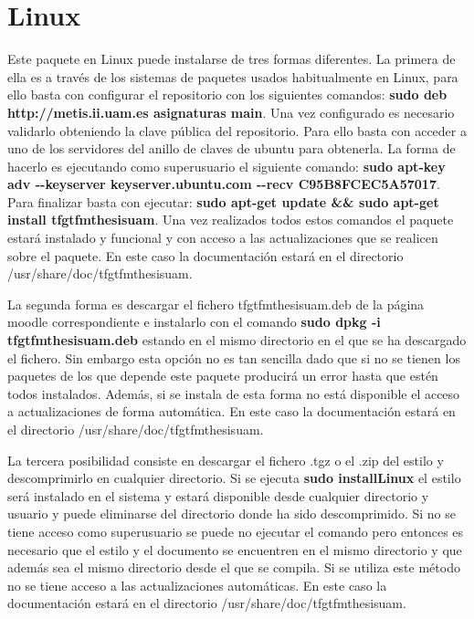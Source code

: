 \section{Linux}

Este paquete en Linux puede instalarse de tres formas diferentes. La primera de ella es a través de los sistemas de paquetes usados habitualmente en Linux,
para ello basta con configurar el repositorio con los siguientes comandos: \textbf{sudo deb http://metis.ii.uam.es asignaturas main}.
Una vez configurado es necesario validarlo obteniendo la clave pública del repositorio. Para ello basta con acceder a uno de los servidores del anillo de claves de ubuntu para obtenerla. La forma de hacerlo es ejecutando como superusuario el siguiente comando: \textbf{sudo apt-key adv -{-}keyserver keyserver.ubuntu.com -{-}recv C95B8FCEC5A57017}. Para finalizar basta con ejecutar: \textbf{sudo apt-get update \&\& sudo apt-get install tfgtfmthesisuam}. Una vez realizados todos estos comandos el paquete estará instalado y funcional y con acceso a las actualizaciones que se realicen sobre el paquete. En este caso la documentación estará en el directorio /usr/share/doc/tfgtfmthesisuam.

La segunda forma es descargar el fichero tfgtfmthesisuam.deb de la página moodle correspondiente e instalarlo con el comando \textbf{sudo dpkg -i tfgtfmthesisuam.deb} estando en el mismo directorio en el que se ha descargado el fichero. Sin embargo esta opción no es tan sencilla dado que si no se tienen los paquetes de los que depende este paquete producirá un error hasta que estén todos instalados. Además, si se instala de esta forma no está disponible el acceso a actualizaciones de forma automática. En este caso la documentación estará en el directorio /usr/share/doc/tfgtfmthesisuam.

La tercera posibilidad consiste en descargar el fichero .tgz o el .zip del estilo y descomprimirlo en cualquier directorio. Si se ejecuta \textbf{sudo installLinux} el estilo será instalado en el sistema y estará disponible desde cualquier directorio y usuario y puede eliminarse del directorio donde ha sido descomprimido. Si no se tiene acceso como superusuario se puede no ejecutar el comando pero entonces es necesario que el estilo y el documento se encuentren en el mismo directorio y que además sea el mismo directorio desde el que se compila. Si se utiliza este método no se tiene acceso a las actualizaciones automáticas. En este caso la documentación estará en el directorio /usr/share/doc/tfgtfmthesisuam.

